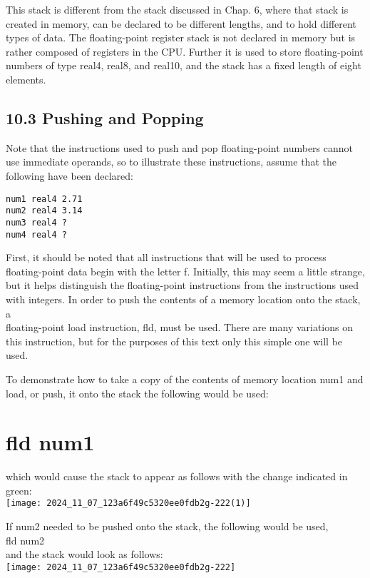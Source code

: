 \documentclass[10pt]{article}
\begin{document}
This stack is different from the stack discussed in Chap. 6, where that stack is created in memory, can be declared to be different lengths, and to hold different types of data. The floating-point register stack is not declared in memory but is rather composed of registers in the CPU. Further it is used to store floating-point numbers of type real4, real8, and real10, and the stack has a fixed length of eight elements.

\subsection*{10.3 Pushing and Popping}
Note that the instructions used to push and pop floating-point numbers cannot use immediate operands, so to illustrate these instructions, assume that the following have been declared:

\begin{verbatim}
num1 real4 2.71
num2 real4 3.14
num3 real4 ?
num4 real4 ?
\end{verbatim}

First, it should be noted that all instructions that will be used to process floating-point data begin with the letter f. Initially, this may seem a little strange, but it helps distinguish the floating-point instructions from the instructions used with integers. In order to push the contents of a memory location onto the stack, a\\
floating-point load instruction, fld, must be used. There are many variations on this instruction, but for the purposes of this text only this simple one will be used.

To demonstrate how to take a copy of the contents of memory location num1 and load, or push, it onto the stack the following would be used:

\section*{fld num1}
which would cause the stack to appear as follows with the change indicated in green:\\
\texttt{[image: 2024\_11\_07\_123a6f49c5320ee0fdb2g-222(1)]}

If num2 needed to be pushed onto the stack, the following would be used,\\
fld num2\\
and the stack would look as follows:\\
\texttt{[image: 2024\_11\_07\_123a6f49c5320ee0fdb2g-222]}
\end{document}
